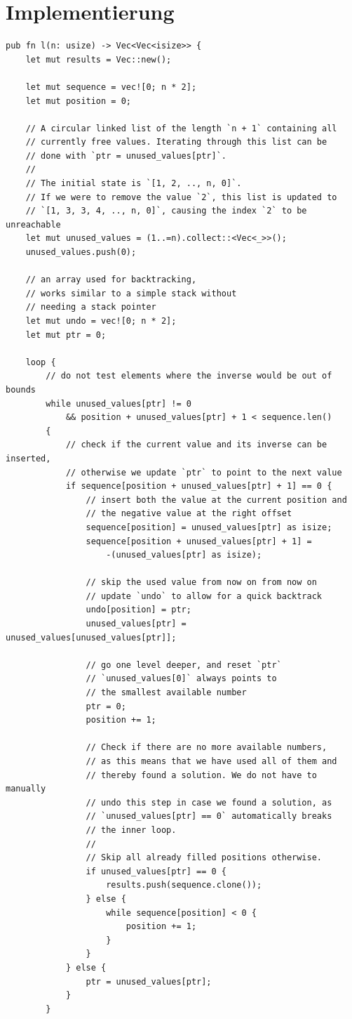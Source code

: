 \section{Implementierung}
\begin{verbatim}
pub fn l(n: usize) -> Vec<Vec<isize>> {
    let mut results = Vec::new();

    let mut sequence = vec![0; n * 2];
    let mut position = 0;

    // A circular linked list of the length `n + 1` containing all
    // currently free values. Iterating through this list can be
    // done with `ptr = unused_values[ptr]`.
    //
    // The initial state is `[1, 2, .., n, 0]`.
    // If we were to remove the value `2`, this list is updated to
    // `[1, 3, 3, 4, .., n, 0]`, causing the index `2` to be unreachable
    let mut unused_values = (1..=n).collect::<Vec<_>>();
    unused_values.push(0);

    // an array used for backtracking,
    // works similar to a simple stack without
    // needing a stack pointer
    let mut undo = vec![0; n * 2];
    let mut ptr = 0;

    loop {
        // do not test elements where the inverse would be out of bounds
        while unused_values[ptr] != 0
            && position + unused_values[ptr] + 1 < sequence.len()
        {
            // check if the current value and its inverse can be inserted,
            // otherwise we update `ptr` to point to the next value 
            if sequence[position + unused_values[ptr] + 1] == 0 {
                // insert both the value at the current position and
                // the negative value at the right offset
                sequence[position] = unused_values[ptr] as isize;
                sequence[position + unused_values[ptr] + 1] =
                    -(unused_values[ptr] as isize);

                // skip the used value from now on from now on
                // update `undo` to allow for a quick backtrack
                undo[position] = ptr;
                unused_values[ptr] = unused_values[unused_values[ptr]];

                // go one level deeper, and reset `ptr`
                // `unused_values[0]` always points to 
                // the smallest available number
                ptr = 0;
                position += 1;

                // Check if there are no more available numbers,
                // as this means that we have used all of them and
                // thereby found a solution. We do not have to manually
                // undo this step in case we found a solution, as
                // `unused_values[ptr] == 0` automatically breaks 
                // the inner loop.
                //
                // Skip all already filled positions otherwise.
                if unused_values[ptr] == 0 {
                    results.push(sequence.clone());
                } else {
                    while sequence[position] < 0 {
                        position += 1;
                    }
                }
            } else {
                ptr = unused_values[ptr];
            }
        }


\end{verbatim}
